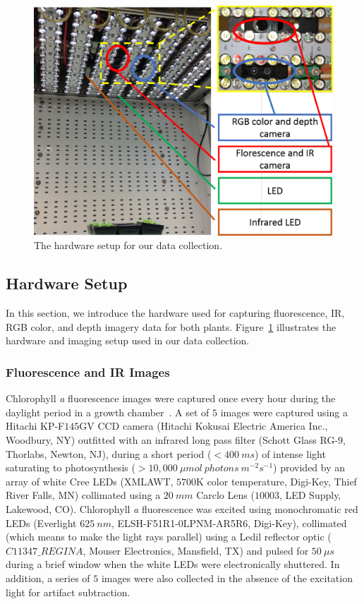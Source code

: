 \begin{figure}
  \includegraphics[width=0.95\linewidth]{Figures/hardware}
\caption{The hardware setup for our data collection.}
\label{fig:hardware}
\end{figure}

\subsection{Hardware Setup}
In this section, we introduce the hardware used for capturing fluorescence, IR, RGB color, and depth imagery data for both plants.
Figure~\ref{fig:hardware} illustrates the hardware and imaging setup used in our data collection.


\subsubsection{Fluorescence and IR Images}
Chlorophyll {\it a} fluorescence images were captured once every hour during the daylight period in a growth chamber~\cite{cruz2015depi}.
A set of $5$ images were captured using a Hitachi KP-F$145$GV CCD camera (Hitachi Kokusai Electric America Inc., Woodbury, NY) outfitted with an infrared long pass filter (Schott Glass RG-$9$, Thorlabs, Newton, NJ), during a short period ($<400~ms$) of intense light saturating to photosynthesis ($>10,000~\mu mol~photons~m^{-2} s^{-1}$) provided by an array of white Cree LEDs (XMLAWT, $5700$K color temperature, Digi-Key, Thief River Falls, MN) collimated using a $20~mm$ Carclo Lens ($10003$, LED Supply, Lakewood, CO).
Chlorophyll {\it a} fluorescence was excited using monochromatic red LEDs (Everlight $625~nm$, ELSH-F51R1-0LPNM-AR5R6, Digi-Key), collimated (which means to make the light rays parallel) using a Ledil reflector optic ($C11347\_REGINA$, Mouser Electronics, Mansfield, TX) and pulsed for $50~\mu s$ during a brief window when the white LEDs were electronically shuttered.
In addition, a series of $5$ images were also collected in the absence of the excitation light for artifact subtraction.

